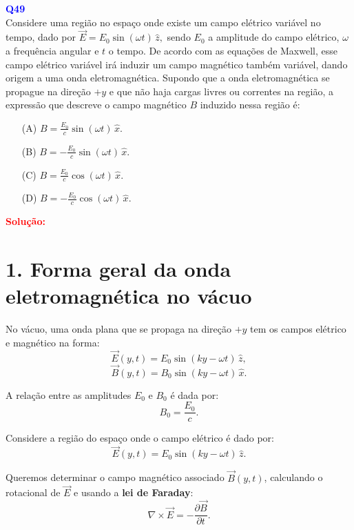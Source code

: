 \documentclass[a4paper,12pt]{article}
\begin{document}
\begin{flushleft}
\textbf{\textcolor{blue}{\Large Q49}}\\
\noindent
Considere uma região no espaço onde existe um campo elétrico variável no tempo, dado por $\vec{E} = E_0 \sin(\omega t) \, \hat{z},$
sendo \(E_0\) a amplitude do campo elétrico, \(\omega\) a frequência angular e \(t\) o tempo. De acordo com as equações de Maxwell, 
esse campo elétrico variável irá induzir um campo magnético também variável, dando origem a uma onda eletromagnética. Supondo que a 
onda eletromagnética se propague na direção \(+y\) e que não haja cargas livres ou correntes na região, a expressão que descreve o 
campo magnético \(B\) induzido nessa região é:


\begin{itemize}
\item[(A)] $B = \frac{ E_0}{c} \sin(\omega t) \, \hat{x}.$
\item[(B)] $B = -\frac{E_0}{c} \sin(\omega t) \, \hat{x}.$
\item[(C)] $B = \frac{E_0}{c} \cos(\omega t) \, \hat{x}.$
\item[(D)] $B = -\frac{E_0}{c} \cos(\omega t) \, \hat{x}.$
\end{itemize}

\vspace{0.5cm}

\textcolor{red}{\textbf{Solução:}}\\



\section*{1. Forma geral da onda eletromagnética no vácuo}

No vácuo, uma onda plana que se propaga na direção \(+\hat{y}\) tem os campos elétrico e magnético na forma:
\[
\vec{E}(y,t) = E_0 \sin(k y - \omega t) \, \hat{z},
\]
\[
\vec{B}(y,t) = B_0 \sin(k y - \omega t) \, \hat{x}.
\]

A relação entre as amplitudes \(E_0\) e \(B_0\) é dada por:
\[
B_0 = \frac{E_0}{c}.
\]

Considere a região do espaço onde o campo elétrico é dado por:
\[
\vec{E}(y,t) = E_0 \sin(k y - \omega t) \, \hat{z}.
\]

Queremos determinar o campo magnético associado \(\vec{B}(y,t)\), calculando o rotacional de \(\vec{E}\) e usando a \textbf{lei de Faraday}:
\[
\nabla \times \vec{E} = -\frac{\partial \vec{B}}{\partial t}.
\]


\end{flushleft}
\end{document}
